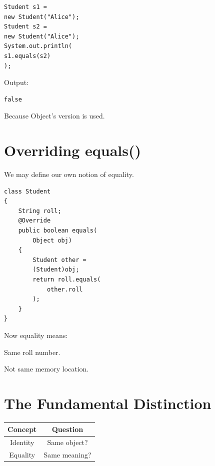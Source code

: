 \documentclass[11pt,a4paper]{book}
\begin{document}
\begin{verbatim} 
Student s1 =
new Student("Alice");
Student s2 =
new Student("Alice");
System.out.println(
s1.equals(s2)
);
\end{verbatim}


Output:

\begin{verbatim}
false
\end{verbatim}


Because Object's version is used.


\section{Overriding equals()}

We may define our own notion
of equality.


\begin{verbatim} 
class Student
{
    String roll;
    @Override
    public boolean equals(
        Object obj)
    {
        Student other =
        (Student)obj;
        return roll.equals(
            other.roll
        );
    }
}
\end{verbatim}


Now equality means:


Same roll number.


Not same memory location.


\section{The Fundamental Distinction}

\begin{center}

\begin{tabular}{|c|c|}
\hline
Concept & Question \\
\hline

Identity &
Same object? \\
\hline

Equality &
Same meaning? \\
\hline

\end{tabular}

\end{center}
\end{document}
